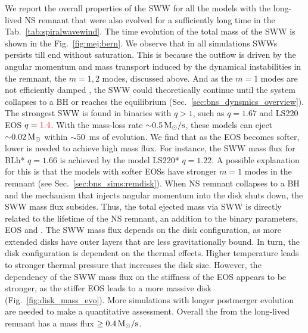 We report the overall properties of the \ac{SWW} for all the models with the 
long-lived \ac{NS} remnant that were also evolved for a sufficiently long time 
in the Tab.~\ref{tab:spiralwavewind}. 
%
The time evolution of the total mass of the \ac{SWW} is shown in the Fig.~\ref{fig:mej:bern}.
We observe that in all simulations \acp{SWW} persists till end without saturation.
This is because the outflow is driven by the angular momentum and mass transport 
induced by the dynamical instabilities in the remnant, the $m=1,2$ modes, discussed 
above. And as the $m=1$ modes are not efficiently damped \citep{Paschalidis:2015mla,Radice:2016gym,Lehner:2016wjg,East:2016zvv},
the \ac{SWW} could theoretically continue until the system collapses to a \ac{BH} 
or reaches the equilibrium (Sec.~\ref{sec:bns_dynsmics_overview}).
%
The strongest \ac{SWW} is found in binaries with $q>1$, such as 
$q=1.67$ and LS220 \ac{EOS} $q=\textcolor{red}{1.4}$. 
With the mass-loss rate ${\sim}0.5\, {\text{M}_{\odot}}/{\text{s}}$, these models can eject 
${\sim}0.02\,{\text{M}_{\odot}}$ within ${\sim}50$~ms of \pmerg{} evolution.
We find that as the \ac{EOS} becomes softer, lower \mr{} is needed to achieve high  %
mass flux. For instance, the \ac{SWW} mass flux for BLh* $q=1.66$ is achieved by the 
model LS220* $q=1.22$. 
A possible explanation for this is that the models with softer \acp{EOS} have stronger 
$m=1$ modes in the remnant (see Sec.~\ref{sec:bns_sims:remdisk}).
When \ac{NS} remnant collapses to a \ac{BH} and the mechanism that injects angular 
momentum into the disk shuts down, the \ac{SWW} mass flux subsides. 
Thus, the total ejected mass via \ac{SWW} is directly related to the lifetime of the 
\ac{NS} remnant, an addition to the binary parameters, \ac{EOS} and \mr{}.
%
The \ac{SWW} mass flux depends on the disk configuration, as more extended disks 
have outer layers that are less gravitationally bound. In turn, the disk 
configuration is dependent on the thermal effects. Higher temperature leads to 
stronger thermal pressure that increases the disk size. 
However, the dependency of the \ac{SWW} mass flux on the stiffness of the \ac{EOS} 
appears to be stronger, as the stiffer \ac{EOS} leads to a more massive disk  %
(Fig.~\ref{fig:disk_mass_evo}). More simulations with longer postmerger evolution are needed 
to make a quantitative assessment. 
Overall the \swind{} from the long-lived remnant has a mass flux $\geq 0.4\, {\text{M}_{\odot}}/{\text{s}}$.

